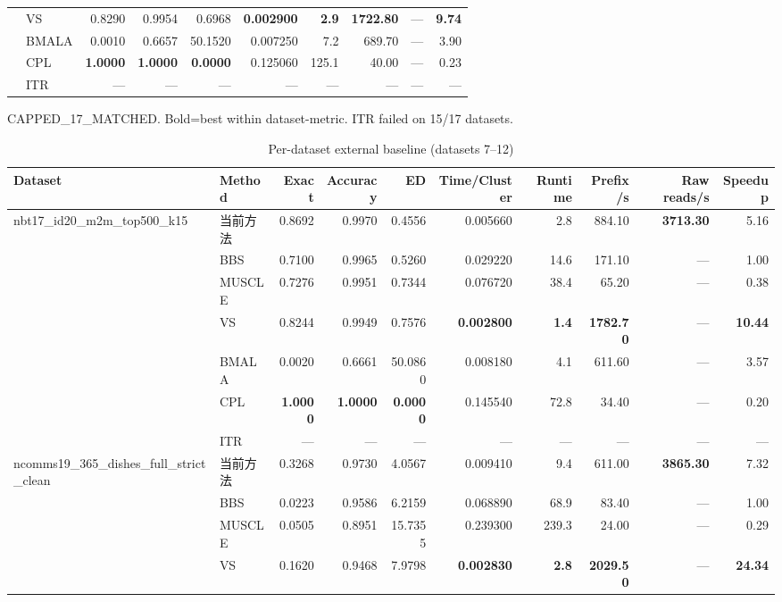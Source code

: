 \begin{table}[htbp]
\begin{tabular}{llrrrrrrrr}
 & VS & 0.8290 & 0.9954 & 0.6968 & \textbf{0.002900} & \textbf{2.9} & \textbf{1722.80} & — & \textbf{9.74} \\
 & BMALA & 0.0010 & 0.6657 & 50.1520 & 0.007250 & 7.2 & 689.70 & — & 3.90 \\
 & CPL & \textbf{1.0000} & \textbf{1.0000} & \textbf{0.0000} & 0.125060 & 125.1 & 40.00 & — & 0.23 \\
 & ITR & — & — & — & — & — & — & — & — \\
\midrule
\bottomrule
\end{tabular}
\vspace{4pt}
\footnotesize{CAPPED_17_MATCHED. Bold=best within dataset-metric. ITR failed on 15/17 datasets.}
\end{table}

\begin{table}[htbp]
\centering
\caption{Per-dataset external baseline (datasets 7–12)}
\label{tab:baselineB}
\small
\begin{tabular}{llrrrrrrrr}
\toprule
Dataset & Method & Exact & Accuracy & ED & Time/Cluster & Runtime & Prefix/s & Raw reads/s & Speedup \\
\midrule
\multirow{7}{*}{nbt17\_id20\_m2m\_top500\_k15} & 当前方法 & 0.8692 & 0.9970 & 0.4556 & 0.005660 & 2.8 & 884.10 & \textbf{3713.30} & 5.16 \\
 & BBS & 0.7100 & 0.9965 & 0.5260 & 0.029220 & 14.6 & 171.10 & — & 1.00 \\
 & MUSCLE & 0.7276 & 0.9951 & 0.7344 & 0.076720 & 38.4 & 65.20 & — & 0.38 \\
 & VS & 0.8244 & 0.9949 & 0.7576 & \textbf{0.002800} & \textbf{1.4} & \textbf{1782.70} & — & \textbf{10.44} \\
 & BMALA & 0.0020 & 0.6661 & 50.0860 & 0.008180 & 4.1 & 611.60 & — & 3.57 \\
 & CPL & \textbf{1.0000} & \textbf{1.0000} & \textbf{0.0000} & 0.145540 & 72.8 & 34.40 & — & 0.20 \\
 & ITR & — & — & — & — & — & — & — & — \\
\midrule
\multirow{7}{*}{ncomms19\_365\_dishes\_full\_strict\_clean} & 当前方法 & 0.3268 & 0.9730 & 4.0567 & 0.009410 & 9.4 & 611.00 & \textbf{3865.30} & 7.32 \\
 & BBS & 0.0223 & 0.9586 & 6.2159 & 0.068890 & 68.9 & 83.40 & — & 1.00 \\
 & MUSCLE & 0.0505 & 0.8951 & 15.7355 & 0.239300 & 239.3 & 24.00 & — & 0.29 \\
 & VS & 0.1620 & 0.9468 & 7.9798 & \textbf{0.002830} & \textbf{2.8} & \textbf{2029.50} & — & \textbf{24.34} \\

\end{tabular}
\end{table}
